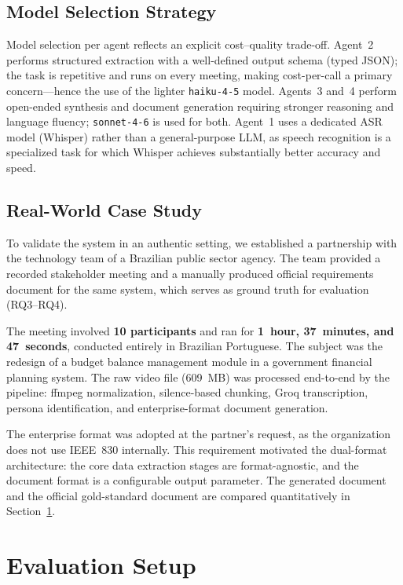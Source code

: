 \documentclass[sigconf]{acmart}
\begin{document}
\subsection{Model Selection Strategy}

Model selection per agent reflects an explicit cost--quality
trade-off. Agent~2 performs structured extraction with a well-defined
output schema (typed JSON); the task is repetitive and runs on every
meeting, making cost-per-call a primary concern---hence the use of
the lighter \texttt{haiku-4-5} model. Agents~3 and~4 perform
open-ended synthesis and document generation requiring stronger
reasoning and language fluency; \texttt{sonnet-4-6} is used for
both. Agent~1 uses a dedicated ASR model (Whisper) rather than a
general-purpose LLM, as speech recognition is a specialized task
for which Whisper achieves substantially better accuracy and speed.

\subsection{Real-World Case Study}
\label{sec:casestudy}

To validate the system in an authentic setting, we established a
partnership with the technology team of a Brazilian public sector
agency. The team provided a recorded stakeholder meeting and a
manually produced official requirements document for the same system,
which serves as ground truth for evaluation (RQ3--RQ4).

The meeting involved \textbf{10 participants} and ran for
\textbf{1~hour, 37~minutes, and 47~seconds}, conducted entirely in
Brazilian Portuguese. The subject was the redesign of a budget balance
management module in a government financial planning system. The raw
video file (609~MB) was processed end-to-end by the pipeline: ffmpeg
normalization, silence-based chunking, Groq transcription, persona
identification, and enterprise-format document generation.

The enterprise format was adopted at the partner's request, as the
organization does not use IEEE~830 internally. This requirement
motivated the dual-format architecture: the core data extraction
stages are format-agnostic, and the document format is a configurable
output parameter. The generated document and the official gold-standard
document are compared quantitatively in Section~\ref{sec:evaluation}.

\section{Evaluation Setup}
\label{sec:evaluation}
\end{document}
